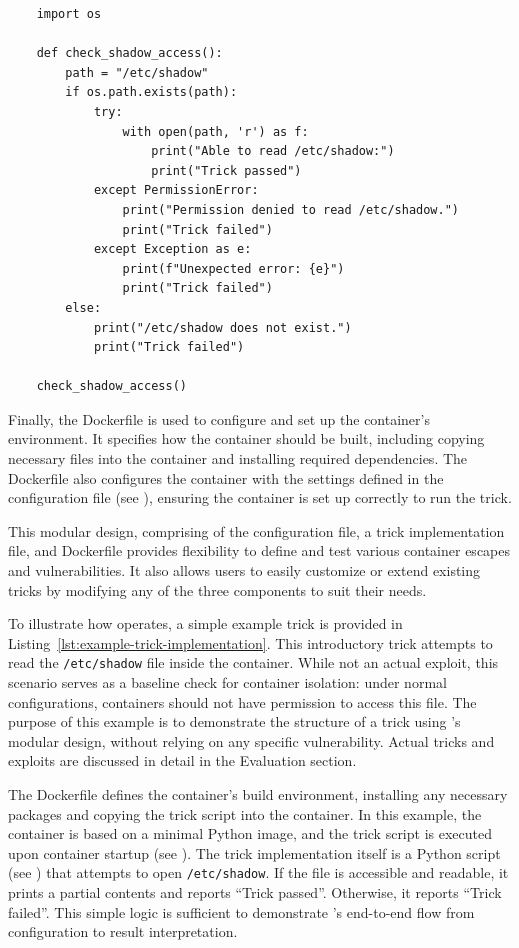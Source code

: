 \begin{listing}[h]
  \caption{Example trick implementation}\label{lst:pythonfile}
  \label{lst:example-trick-implementation}
  \begin{verbatim}
    import os

    def check_shadow_access():
        path = "/etc/shadow"
        if os.path.exists(path):
            try:
                with open(path, 'r') as f:
                    print("Able to read /etc/shadow:")
                    print("Trick passed")
            except PermissionError:
                print("Permission denied to read /etc/shadow.")
                print("Trick failed")
            except Exception as e:
                print(f"Unexpected error: {e}")
                print("Trick failed")
        else:
            print("/etc/shadow does not exist.")
            print("Trick failed")

    check_shadow_access()
  \end{verbatim}
\end{listing}


Finally, the Dockerfile is used to configure and set up the container's environment. It specifies how the container should be built, including copying necessary files into the container and installing required dependencies. The Dockerfile also configures the container with the settings defined in the configuration file (see ), ensuring the container is set up correctly to run the trick.

This modular design, comprising of the configuration file, a trick implementation file, and Dockerfile provides flexibility to define and test various container escapes and vulnerabilities. It also allows users to easily customize or extend existing tricks by modifying any of the three components to suit their needs.

To illustrate how \houdini operates, a simple example trick is provided in Listing~\ref{lst:example-trick-implementation}. This introductory trick attempts to read the \texttt{/etc/shadow} file inside the container. While not an actual exploit, this scenario serves as a baseline check for container isolation: under normal configurations, containers should not have permission to access this file. The purpose of this example is to demonstrate the structure of a trick using \houdini’s modular design, without relying on any specific vulnerability. Actual tricks and exploits are discussed in detail in the Evaluation section.

The Dockerfile defines the container’s build environment, installing any necessary packages and copying the trick script into the container. In this example, the container is based on a minimal Python image, and the trick script is executed upon container startup (see ). The trick implementation itself is a Python script (see ) that attempts to open \texttt{/etc/shadow}. If the file is accessible and readable, it prints a partial contents and reports ``Trick passed''. Otherwise, it reports ``Trick failed''. This simple logic is sufficient to demonstrate \houdini’s end-to-end flow from configuration to result interpretation.
